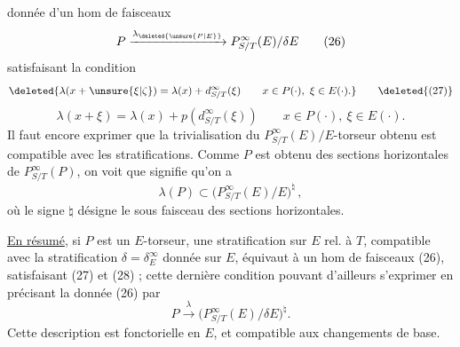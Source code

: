donnée d'un hom de faisceaux
\[
 P \xrightarrow{\lambda_{\deleted{\unsure{P|E}}}} P^\infty_{S/T}(E)/\delta E \tag*{(26)}
\]
satisfaisant la condition
\[
 \deleted{\lambda(x+\unsure{\xi|\zeta})=\lambda(x)+d^\infty_{S/T}(\xi)\qquad x\in P(\cdot),\ \xi\in E(\cdot).} \tag*{\deleted{(27)}}
\]
\[
 \lambda(x+\xi)=\lambda(x)+p(d^\infty_{S/T}(\xi))\qquad x\in P(\cdot),\ \xi\in E(\cdot). \tag*{(27)}
\]
Il faut encore exprimer que la trivialisation du $P^\infty_{S/T}(E)/E$-torseur obtenu est compatible avec les stratifications. Comme $P$ est  obtenu des sections horizontales de $P^\infty_{S/T}(P)$, on voit que 
  signifie qu'on a
\[
 \lambda(P)\subset\bigl(P^\infty_{S/T}(E)/E\bigr)^{\natural} \,, \tag*{(28)}
\]
où le  signe $\natural$ désigne le sous faisceau des sections horizontales.

 \uline{En résumé},  si $P$ est un $E$-torseur, une stratification sur $E$ rel. à $T$, compatible avec la stratification $\delta=\delta^\infty_E$ donnée sur $E$, équivaut à un hom de faisceaux (26), satisfaisant (27) et (28) ; cette dernière condition pouvant d'ailleurs s'exprimer en précisant la donnée (26) par
\[
 P\xrightarrow{\lambda}\bigl(P^\infty_{S/T}(E)/\delta E\bigr)^\natural . \tag*{(26$'$)}
\]
Cette description est fonctorielle en $E$, et compatible aux changements de base.
